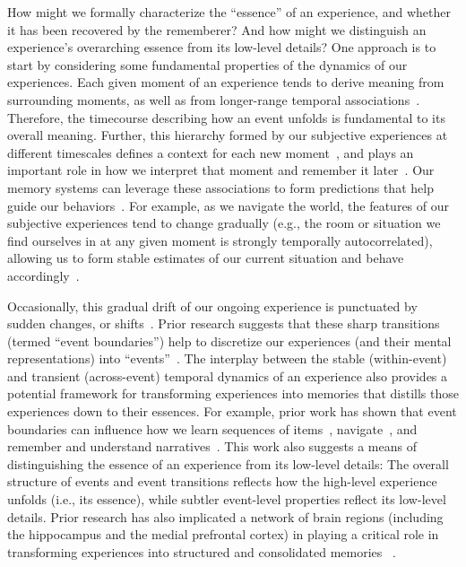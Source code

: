 \documentclass[10pt]{article}
\begin{document}
How might we formally characterize the ``essence'' of an experience, and whether it has been recovered by the rememberer?  And how might we distinguish an experience's overarching essence from its low-level details?  One approach is to start by considering some fundamental properties of the dynamics of our experiences.  Each given moment of an experience tends to derive meaning from surrounding moments, as well as from longer-range temporal associations~\citep{LernEtal11, Mann19, Mann20}.  Therefore, the timecourse describing how an event unfolds is fundamental to its overall meaning.  Further, this hierarchy formed by our subjective experiences at different timescales defines a context for each new moment~\citep[e.g.,][]{HowaKaha02a, HowaEtal14}, and plays an important role in how we interpret that moment and remember it later~\citep[for review see][]{MannEtal15, Mann20}.  Our memory systems can leverage these associations to form predictions that help guide our behaviors~\citep{RangRitc12}.  For example, as we navigate the world, the features of our subjective experiences tend to change gradually (e.g., the room or situation we find ourselves in at any given moment is strongly temporally autocorrelated), allowing us to form stable estimates of our current situation and behave accordingly~\citep{ZackEtal07, ZwaaRadv98}.

Occasionally, this gradual drift of our ongoing experience is punctuated by sudden changes, or shifts~\citep[e.g., when we walk through a doorway;][]{RadvZack17}.  Prior research suggests that these sharp transitions (termed ``event boundaries'') help to discretize our experiences (and their mental representations) into ``events''~\citep{RadvZack17, BrunEtal18, HeusEtal18b, ClewDava17, EzzyDava11, DuBrDava13}.  The interplay between the stable (within-event) and transient (across-event) temporal dynamics of an experience also provides a potential framework for transforming experiences into memories that distills those experiences down to their essences.  For example, prior work has shown that event boundaries can influence how we learn sequences of items~\citep{HeusEtal18b, DuBrDava13}, navigate~\citep{BrunEtal18}, and remember and understand narratives~\citep{ZwaaRadv98, EzzyDava11}.  This work also suggests a means of distinguishing the essence of an experience from its low-level details:  The overall structure of events and event transitions reflects how the high-level experience unfolds (i.e., its essence), while subtler event-level properties reflect its low-level details.  Prior research has also implicated a network of brain regions (including the hippocampus and the medial prefrontal cortex) in playing a critical role in transforming experiences into structured and consolidated memories ~\citep{TompDava17}.
\end{document}
